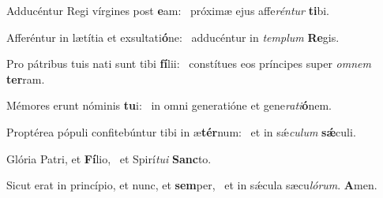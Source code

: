 \item Adducéntur Regi vírgines post \textbf{e}am:~\psstar{} próximæ ejus affe\textit{rén}\textit{tur} \textbf{ti}bi.
\item Afferéntur in lætítia et exsultati\textbf{ó}ne:~\psstar{} adducéntur in \textit{tem}\textit{plum} \textbf{Re}gis.
\item Pro pátribus tuis nati sunt tibi \textbf{fí}lii:~\psstar{} constítues eos príncipes super \textit{om}\textit{nem} \textbf{ter}ram.
\item Mémores erunt nóminis \textbf{tu}i:~\psstar{} in omni generatióne et gene\textit{ra}\textit{ti}\textbf{ó}nem.
\item Proptérea pópuli confitebúntur tibi in æ\textbf{tér}num:~\psstar{} et in sǽ\textit{cu}\textit{lum} \textbf{sǽ}culi.
\item Glória Patri, et \textbf{Fí}lio,~\psstar{} et Spirí\textit{tu}\textit{i} \textbf{Sanc}to.
\item Sicut erat in princípio, et nunc, et \textbf{sem}per,~\psstar{} et in sǽcula sæcu\textit{ló}\textit{rum}. \textbf{A}men.
